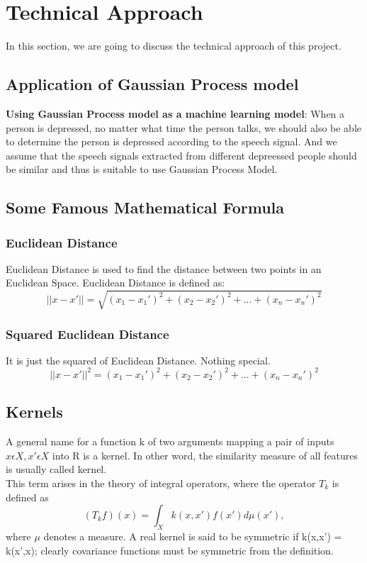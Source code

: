 \documentclass{article}
\begin{document}
	\section{Technical Approach}
	In this section, we are going to discuss the technical approach of this project. 

	\subsection{Application of Gaussian Process model}
	
	\textbf{Using Gaussian Process model as a machine learning model}: 
	When a person is depressed, no matter what time the person talks, we should also be able to determine the person is depressed according 
	to the speech signal. And we assume that the speech signals extracted from different depreessed people should be similar and thus is suitable 
	to use Gaussian Process Model.

	\subsection{Some Famous Mathematical Formula}
	\subsubsection{Euclidean Distance}
	Euclidean Distance is used to find the distance between two points in an Euclidean Space. Euclidean Distance is defined as:
	\begin{equation}\label{eq:eucdis}
		||x-x'|| = \sqrt{(x_{1} - {x_{1}}')^{2} + (x_{2} - {x_{2}}')^{2} + ... + (x_{n} - {x_{n}}')^{2}}  
	\end{equation}

	\subsubsection{Squared Euclidean Distance}
	It is just the squared of Euclidean Distance. Nothing special.
	\begin{equation}\label{eq:sq_eucdis}
		||x-x'||^{2} = (x_{1} - {x_{1}}')^{2} + (x_{2} - {x_{2}}')^{2} + ... + (x_{n} - {x_{n}}')^{2}  
	\end{equation}

	\subsection{Kernels}
	A general name for a function k of two arguments mapping a pair of inputs \( x \epsilon X, x' \epsilon X\) into R is a kernel.
	In other word, the similarity measure of all features is usually called kernel.\\
	This term arises in the theory of integral operators, where the operator \(T_{k}\) is defined as
	\begin{equation}\label{eq:Kernel_Tk}
		(T_{k}f)(x) = \int_{X} k(x,x') f(x') d\mu(x'),
	\end{equation}
	where \(\mu\) denotes a measure. A real kernel is said to be symmetric if k(x,x') = k(x',x); 
	clearly covariance functions must be symmetric from the definition.\\\\
	
\end{document}
